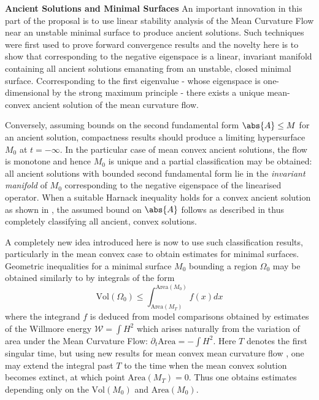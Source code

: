 \documentclass[12pt]{amsart}
\begin{document}
\noindent\textbf{Ancient Solutions and Minimal Surfaces}
\label{sec:orgheadline13}
An important innovation in this part of the proposal is to use linear stability analysis of the Mean Curvature Flow near an unstable minimal surface to produce ancient solutions. Such techniques were first used to prove forward convergence results \cite{MR1485470} and the novelty here is to show that corresponding to the negative eigenspace is a linear, invariant manifold containing all ancient solutions emanating from an unstable, closed minimal surface. Ccorresponding to the first eigenvalue - whose eigenspace is one-dimensional by the strong maximum principle - there exists a unique mean-convex ancient solution of the mean curvature flow.

Conversely, assuming bounds on the second fundamental form \(\abs{A} \leq M\) for an ancient solution, compactness results should produce a limiting hypersurface \(M_0\) at \(t=-\infty\). In the particular case of mean convex ancient solutions, the flow is monotone and hence \(M_0\) is unique and a partial classification may be obtained: all ancient solutions with bounded second fundamental form lie in the \emph{invariant manifold} of \(M_0\) corresponding to the negative eigenspace of the linearised operator. When a suitable Harnack inequality holds for a convex ancient solution as shown in \cite{BIS4}, the assumed bound on \(\abs{A}\) follows as described in \cite{2015arXiv150802821B} thus completely classifying all ancient, convex solutions.

A completely new idea introduced here is now to use such classification results, particularly in the mean convex case to obtain estimates for minimal surfaces. Geometric inequalities for a minimal surface \(M_0\) bounding a region \(\Omega_0\) may be obtained similarly to \cite{MR1650335} by integrals of the form
\[
\text{Vol}(\Omega_0) \leq \int_{\text{Area}(M_T)}^{\text{Area}(M_0)} f(x) dx
\]
where the integrand \(f\) is deduced from model comparisons obtained by estimates of the Willmore energy \(\mathcal{W} = \int H^2\) which arises naturally from the variation of area under the Mean Curvature Flow: $\partial_t \text{Area} = -\int H^2.$ Here \(T\) denotes the first singular time, but using new results for mean convex mean curvature flow \cite{2013arXiv1304.0926H,MR3570481}, one may extend the integral past \(T\) to the time when the mean convex solution becomes extinct, at which point \(\text{Area}(M_T) = 0\). Thus one obtains estimates depending only on the \(\text{Vol}(M_0)\) and \(\text{Area}(M_0)\).
\end{document}
